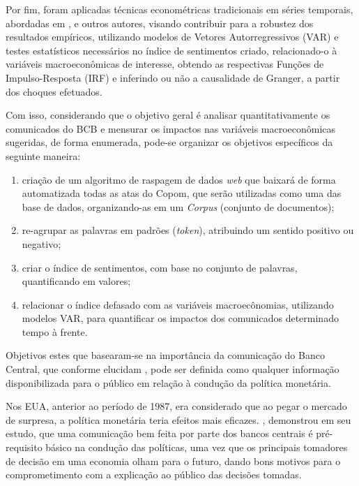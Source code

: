 Por fim, foram aplicadas técnicas econométricas tradicionais em séries temporais, abordadas em ,  e outros autores, visando contribuir para a robustez dos resultados empíricos, utilizando modelos de Vetores Autorregressivos (VAR) e testes estatísticos necessários no índice de sentimentos criado, relacionado-o à variáveis macroeconômicas de interesse, obtendo as respectivas Funções de Impulso-Resposta (IRF) e inferindo ou não a causalidade de Granger, a partir dos choques efetuados. 

Com isso, considerando que o objetivo geral é analisar quantitativamente os comunicados do BCB e mensurar os impactos nas variáveis macroeconômicas sugeridas, de forma enumerada, pode-se organizar os objetivos específicos da seguinte maneira:

\begin{enumerate}[noitemsep,nosep,labelindent=\parindent,leftmargin=*,label={\alph*}) ] 
	\item criação de um algoritmo de raspagem de dados \textit{web} que baixará de forma automatizada todas as atas do Copom, que serão utilizadas como uma das base de dados, organizando-as em um \textit{Corpus} (conjunto de documentos);
	\item re-agrupar as palavras em padrões (\textit{token}), atribuindo um sentido positivo ou negativo;
	\item criar o índice de sentimentos, com base no conjunto de palavras, quantificando em valores;
	\item relacionar o índice defasado com as variáveis macroecônomias, utilizando modelos VAR, para quantificar os impactos dos comunicados determinado tempo à frente.
\end{enumerate}

Objetivos estes que basearam-se na importância da comunicação do Banco Central, que conforme elucidam , pode ser definida como qualquer informação disponibilizada para o público em relação à condução da política monetária.

Nos EUA, anterior ao período de 1987, era considerado que ao pegar o mercado de surpresa, a política monetária teria efeitos mais eficazes. , demonstrou em seu estudo, que uma comunicação bem feita por parte dos bancos centrais é pré-requisito básico na condução das políticas, uma vez que os principais tomadores de decisão em uma economia olham para o futuro, dando bons motivos para o comprometimento com a explicação ao público das decisões tomadas.

